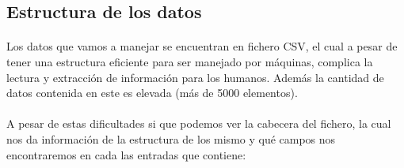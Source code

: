 \documentclass{article}
\begin{document}
		\subsection{Estructura de los datos}
			
			\paragraph{}
			Los datos que vamos a manejar se encuentran en fichero CSV, el cual a pesar de tener una estructura eficiente para ser manejado por máquinas, complica la lectura y extracción de información para los humanos. Además la cantidad de datos contenida en este es elevada (más de 5000 elementos).
			
			\paragraph{}
			A pesar de estas dificultades si que podemos ver la cabecera del fichero, la cual nos da información de la estructura de los mismo y qué campos nos encontraremos en cada las entradas que contiene:
	
\end{document}
